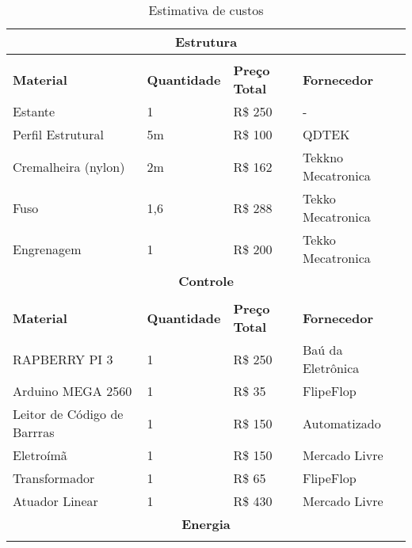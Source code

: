\begin{table}[!h]
\centering
\caption{Estimativa de custos}
\begin{tabular}{|l|l|l|l|}
\multicolumn{4}{c}{Estrutura}   \\ \hline                                                                                              \\
\textbf{Material}                    & \textbf{Quantidade} & \textbf{Preço Total} & {\textbf{Fornecedor}}    \\ \hline
Estante                              & 1                   & R\$ 250              & {-}                     \\
Perfil Estrutural                    & 5m                  & R\$ 100              & {QDTEK}                 \\
Cremalheira (nylon)                  & 2m                  & R\$ 162              & {Tekkno Mecatronica}    \\
Fuso                                 & 1,6                 & R\$ 288              & {Tekko Mecatronica}     \\
Engrenagem                           & 1                   & R\$ 200              & {Tekko Mecatronica}      \\ \hline
\multicolumn{5}{c}{\textbf{Controle}} \\ \hline                                                                                         \\
\textbf{Material}                    & \textbf{Quantidade} & \textbf{Preço Total} & {\textbf{Fornecedor}}   \\ \hline 
RAPBERRY PI 3                        & 1                   & R\$ 250              & {Baú da Eletrônica}     \\
Arduino MEGA 2560                    & 1                   & R\$ 35               & {FlipeFlop}             \\
Leitor de Código de Barrras          & 1                   & R\$ 150              & {Automatizado}          \\
Eletroímã                            & 1                   & R\$ 150              & {Mercado Livre}         \\
Transformador                        & 1                   & R\$ 65               & {FlipeFlop}             \\
Atuador Linear                       & 1                   & R\$ 430              & {Mercado Livre}          \\ \hline
\multicolumn{5}{c}{\textbf{Energia}} \\ \hline                                                                                           \\

\end{tabular}
\end{table}
